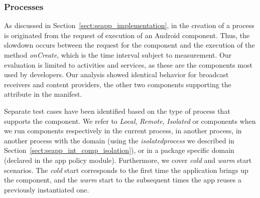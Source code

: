 \subsubsection{Processes}

As discussed in Section~\ref{sect:seapp_implementation}, in \seapp the
creation of a process is originated from the request of execution of
an Android component.  Thus, the slowdown occurs between the request
for the component and the execution of the method \textit{onCreate},
which is the time interval subject to measurement.  Our evaluation is
limited to activities and services, as these are the components most
used by developers.  Our analysis showed identical behavior for
broadcast receivers and content providers, the other two components
supporting the \process attribute in the manifest.

Separate test cases have been identified based on the type of process
that supports the component.  We refer to \emph{Local}, \emph{Remote},
\emph{Isolated} or \emph{\seapp} components when we run components
respectively in the current process, in another process, in another
process with the \isolatedapp domain (using the {\em isolatedprocess}
we described in Section~\ref{sect:seapp_int_comp_isolation}), or in a
package specific domain (declared in the app policy module).
Furthermore, we cover \emph{cold} and \emph{warm} start scenarios.
The {\em cold} start corresponds to the first time the application
brings up the component, and the {\em warm} start to the subsequent
times the app reuses a previously instantiated one.

